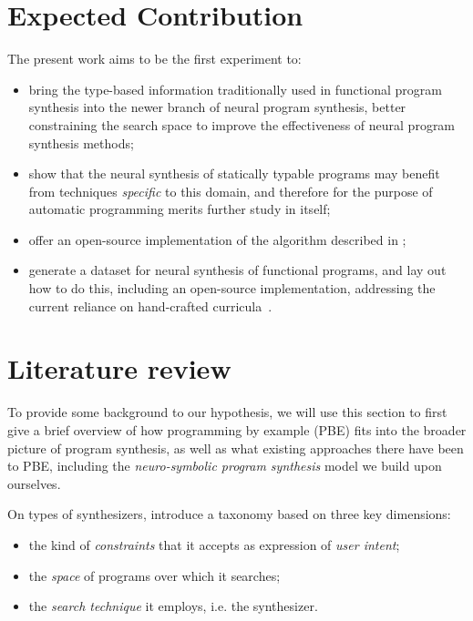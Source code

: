 \documentclass{article} %
\begin{document}

\section{Expected Contribution} %

The present work aims to be the first experiment to:
\begin{itemize}
    \item bring the type-based information traditionally used in functional program synthesis into the newer branch of neural program synthesis,
    better constraining the search space to improve the effectiveness of neural program synthesis methods;
    \item show that the neural synthesis of statically typable programs may benefit from techniques \emph{specific} to this domain, and therefore for the purpose of automatic programming merits further study in itself;
    \item offer an open-source implementation of the algorithm described in \citet{nsps};
    \item generate a dataset for neural synthesis of functional programs, and lay out how to do this, including an open-source implementation, addressing the current reliance on hand-crafted curricula~\citep{nps}.
\end{itemize}


\section{Literature review} \label{sec:litreview}

To provide some background to our hypothesis,
we will use this section to first give a brief overview of how programming by example (PBE) fits into the broader picture of program synthesis,
as well as what existing approaches there have been to PBE,
including the \emph{neuro-symbolic program synthesis} model we build upon ourselves.

On types of synthesizers,
\citet{gulwani2017program} introduce a taxonomy based on three key dimensions:
\begin{itemize}
    \item the kind of \emph{constraints} that it accepts as expression of \emph{user intent};
    \item the \emph{space} of programs over which it searches;
    \item the \emph{search technique} it employs, i.e. the synthesizer.
\end{itemize}
\end{document}
